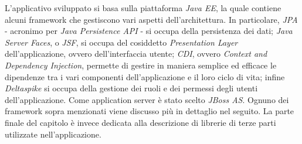L'applicativo sviluppato si basa sulla piattaforma \textsl{Java EE}, la quale contiene alcuni framework che gestiscono vari aspetti dell'architettura.
In particolare, \textsl{JPA} - acronimo per \textsl{Java Persistence API} - si occupa della persistenza dei dati; \textsl{Java Server Faces}, o \textsl{JSF}, si occupa del cosiddetto \textsl{Presentation Layer} dell'applicazione,
ovvero dell'interfaccia utente; \textsl{CDI}, ovvero \textsl{Context and Dependency Injection}, permette di gestire in maniera semplice ed efficace le dipendenze tra i vari componenti dell'applicazione e il loro ciclo di vita;
infine \textsl{Deltaspike} si occupa della gestione dei ruoli e dei permessi degli utenti dell'applicazione. Come application server è stato scelto \textsl{JBoss AS}.\newline
Ognuno dei framework sopra menzionati viene discusso più in dettaglio nel seguito. La parte finale del capitolo è invece dedicata alla descrizione di librerie di terze parti utilizzate nell'applicazione.